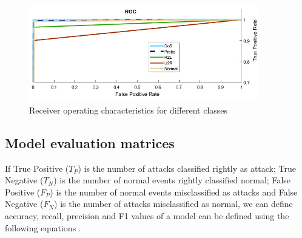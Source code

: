 \documentclass[runningheads]{llncs}
\begin{document}
    \begin{figure}
      \centering
\includegraphics[width=0.89\textwidth]{Figures/ROC.png}
\caption{Receiver operating characteristics for different classes}
      \label{fig:RoC}
    \end{figure}

\FloatBarrier

\subsection{Model evaluation matrices}

If True Positive ($T_P$) is the number of attacks classified
rightly as attack; True Negative ($T_N$) is the number of normal
events rightly classified normal; False Positive ($F_P$) is the
number of normal events misclassified as attacks and False
Negative ($F_N$) is the number of attacks misclassified as
normal, we can define accuracy, recall, precision and F1 values of a model can be defined using the following equations \cite{SOKOLOVA2009}.
\end{document}
